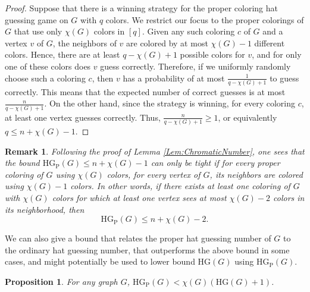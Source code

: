 \documentclass[a4paper,11pt]{amsproc}
\theoremstyle{plain}
\newtheorem{Proposition} [Theorem] {Proposition}
\newtheorem{Remark} [Theorem] {Remark}
\theoremstyle{definition}
\newcommand{\HG}{{\mathrm{HG}}}
\newcommand{\HGP}{\mathrm{HG_{P}}}
\begin{document}
\begin{proof}
 Suppose that there is a winning strategy for the proper coloring hat guessing game on $G$ with $q$ colors.
 We restrict our focus to the proper colorings of $G$ that use only $\chi(G)$ colors in $[q]$.
 Given any such coloring $c$ of $G$ and a vertex $v$ of $G$, the neighbors of $v$ are colored by at most $\chi(G)-1$ different colors.
 Hence, there are at least $q-\chi(G)+1$ possible colors for $v$, and for only one of these colors does $v$ guess correctly.
 Therefore, if we uniformly randomly choose such a coloring $c$, then $v$ has a probability of at most $\frac{1}{q-\chi(G)+1}$ to guess correctly.
 This means that the expected number of correct guesses is at most $\frac{n}{q-\chi(G)+1}$.
 On the other hand, since the strategy is winning, for every coloring $c$, at least one vertex guesses correctly.
 Thus, $\frac{n}{q-\chi(G)+1} \geq 1$, or equivalently $q \leq n + \chi(G) - 1$.
\end{proof}

\begin{Remark}
 \label{Rmk:ChromaticNumber}
 Following the proof of Lemma \ref{Lem:ChromaticNumber}, one sees that the bound $\HGP(G) \leq n + \chi(G) - 1$ can only be tight if for every proper coloring of $G$ using $\chi(G)$ colors, for every vertex of $G$, its neighbors are colored using $\chi(G)-1$ colors.
 In other words, if there exists at least one coloring of $G$ with $\chi(G)$ colors for which at least one vertex sees at most $\chi(G)-2$ colors in its neighborhood, then
 \[
  \HGP(G) \leq n + \chi(G) - 2.
 \]
\end{Remark}

We can also give a bound that relates the proper hat guessing number of $G$ to the ordinary hat guessing number, that outperforms the above bound in some cases, and might potentially be used to lower bound $\HG(G)$ using $\HGP(G)$.

\begin{Proposition}
 \label{Lem:BoundFromOrdinaryHG}
 For any graph $G$, $\HGP(G) < \chi(G)(\HG(G) + 1)$.
\end{Proposition}
\end{document}
